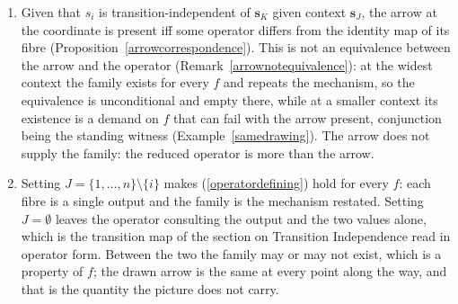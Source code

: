 \documentclass{article}
\theoremstyle{definition}
\theoremstyle{remark}
\begin{document}
\begin{enumerate}[label=(\alph*)]
\item Given that $s_i$ is transition-independent of $\boldsymbol{s}_K$ given context $\boldsymbol{s}_J$, the arrow at the coordinate is present iff some operator differs from the identity map of its fibre (Proposition~\ref{arrowcorrespondence}). This is not an equivalence between the arrow and the operator (Remark~\ref{arrownotequivalence}): at the widest context the family exists for every $f$ and repeats the mechanism, so the equivalence is unconditional and empty there, while at a smaller context its existence is a demand on $f$ that can fail with the arrow present, conjunction being the standing witness (Example~\ref{samedrawing}). The arrow does not supply the family: the reduced operator is more than the arrow.
\item Setting $J = \{1, \ldots, n\} \setminus \{i\}$ makes (\ref{operatordefining}) hold for every $f$: each fibre is a single output and the family is the mechanism restated. Setting $J = \emptyset$ leaves the operator consulting the output and the two values alone, which is the transition map of the section on Transition Independence read in operator form. Between the two the family may or may not exist, which is a property of $f$; the drawn arrow is the same at every point along the way, and that is the quantity the picture does not carry.
\end{enumerate}
\end{document}
